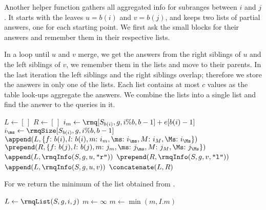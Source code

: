 Another helper function \rmqList{} gathers all aggregated info for subranges between $i$ and $j$.
It starts with the leaves $u = b(i)$ and $v = b(j)$, and keeps two lists of partial answers, one for each starting point.
We first ask the small blocks for their answers and remember them in their respective lists.

In a loop until $u$ and $v$ merge, we get the answers from the right siblings of $u$ and the left siblings of $v$, we remember them in the lists and move to their parents.
In the last iteration the left siblings and the right siblings overlap; therefore we store the answers in only one of the lists.
Each list contains at most $c$ values as the table look-ups aggregate the answers.
We combine the lists into a single list and find the answer to the queries in it.

\begin{algorithm}
\begin{algorithmic}
 
	\State $L \gets [\,]$%
	\Instr $R \gets [\,]$ 
	\State $i_m \gets \rmq[S_{b(i)}, g, i \% b, b - 1] + e[b(i) - 1]$ 
	\State $i_{\ms} \gets \rmqSize[S_{b(i)}, g, i \% b, b - 1]$ 
	\State $\append(L, \{\struct{f}{b(i)}, \struct{l}{b(i)}, \struct{m}{i_m}, \struct{\ms}{i_{\ms}}, \struct{M}{i_M}, \struct{\Ms}{i_{\Ms}} \})$ 
	\State $\prepend(R, \{\struct{f}{b(j)}, \struct{l}{b(j)}, \struct{m}{j_m}, \struct{\ms}{j_{\ms}}, \struct{M}{j_M}, \struct{\Ms}{j_{\Ms}} \})$ 
	 
		\State $\append(L, \rmqInfo(S, g, u, \str{r}))$
		\State $\prepend(R, \rmqInfo(S, g, v, \str{l}))$
	\EndWhile
	\State $\append(L, \rmqInfo(S, g, u, v))$ 
	\State $\concatenate(L, R)$
	\State {}
\EndFunction
\end{algorithmic}
\end{algorithm}

\bigbreak

For \rmq{} we return the minimum of the list obtained from \rmqList{}.

\begin{algorithm}
\begin{algorithmic}
		\State {}
	\Else
		\State $L \gets \rmqList(S, g, i, j)$
		\State $m \gets \infty$
			\State $m \gets \min(m, I.m)$
		\EndFor
		\State {}
	\EndIf
\EndFunction
\end{algorithmic}
\end{algorithm}

